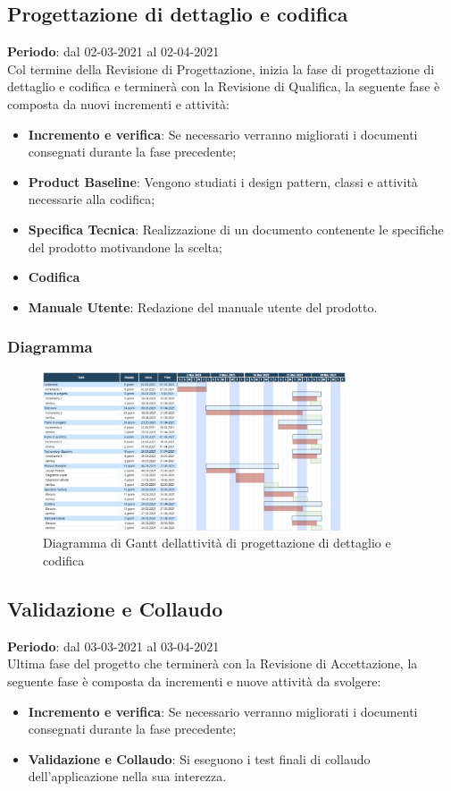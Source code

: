 	
	\subsection{Progettazione di dettaglio e codifica}
	\textbf{Periodo}: dal 02-03-2021 al 02-04-2021 \\
	Col termine della Revisione di Progettazione, inizia la fase di progettazione di dettaglio e codifica e terminerà con la Revisione di Qualifica, la seguente fase è composta da nuovi incrementi e attività:
	\begin{itemize}
		\item \textbf{Incremento e verifica}: Se necessario verranno migliorati i documenti consegnati durante la fase precedente;
		\item \textbf{Product Baseline}: Vengono studiati i design pattern, classi e attività necessarie alla codifica;
		\item \textbf{Specifica Tecnica}: Realizzazione di un documento contenente le specifiche del prodotto motivandone la scelta;
		\item \textbf{Codifica}
		\item \textbf{Manuale Utente}: Redazione del manuale utente del prodotto.
	\end{itemize}
	
	\subsubsection{Diagramma}
		\begin{figure}[H]
        		\centering
        		\includegraphics[width=0.8\textwidth]{source/img/Progettazionedettaglio_codifica.png}
        		\caption{Diagramma di Gantt dell\textquotesingle attività di progettazione di dettaglio e codifica}
    		\end{figure}

	\subsection{Validazione e Collaudo}
	\textbf{Periodo}: dal 03-03-2021 al 03-04-2021 \\
	Ultima fase del progetto che terminerà con la Revisione di Accettazione, la seguente fase è composta da incrementi e nuove attività da svolgere:
	\begin{itemize}
		\item \textbf{Incremento e verifica}: Se necessario verranno migliorati i documenti consegnati durante la fase precedente;
		\item \textbf{Validazione e Collaudo}: Si eseguono i test finali di collaudo dell'applicazione nella sua interezza.
	\end{itemize}
	
